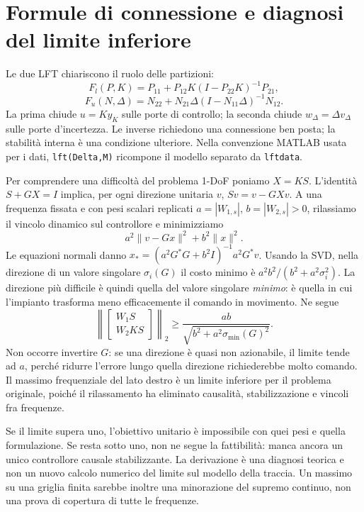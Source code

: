\section{Formule di connessione e diagnosi del limite inferiore}
Le due LFT chiariscono il ruolo delle partizioni:
\begin{equation}\label{eq:lowerlft}
 F_l(P,K)=P_{11}+P_{12}K(I-P_{22}K)^{-1}P_{21},
\end{equation}
\begin{equation}\label{eq:upperlft}
 F_u(N,\Delta)=N_{22}+N_{21}\Delta(I-N_{11}\Delta)^{-1}N_{12}.
\end{equation}
La prima chiude $u=Ky_K$ sulle porte di controllo; la seconda chiude
$w_\Delta=\Delta v_\Delta$ sulle porte d'incertezza. Le inverse
richiedono una connessione ben posta; la stabilità interna è una
condizione ulteriore. Nella convenzione MATLAB usata per i dati,
\texttt{lft(Delta,M)} ricompone il modello separato da \texttt{lftdata}.

Per comprendere una difficoltà del problema 1-DoF poniamo $X=KS$.
L'identità $S+GX=I$ implica, per ogni direzione unitaria $v$,
$Sv=v-GXv$. A una frequenza fissata e con pesi scalari replicati
$a=|W_{1,s}|$, $b=|W_{2,s}|>0$, rilassiamo il vincolo dinamico sul
controllore e minimizziamo
\[
 a^2\|v-Gx\|^2+b^2\|x\|^2.
\]
Le equazioni normali danno
$x_*=(a^2G^*G+b^2I)^{-1}a^2G^*v$.
Usando la SVD, nella direzione di un valore singolare $\sigma_i(G)$
il costo minimo è $a^2b^2/(b^2+a^2\sigma_i^2)$.
La direzione più difficile è quindi quella del valore singolare
\emph{minimo}: è quella in cui l'impianto trasforma meno efficacemente
il comando in movimento. Ne segue
\[
 \left\|\begin{bmatrix}W_1S\\W_2KS\end{bmatrix}\right\|_2
 \ge\frac{ab}{\sqrt{b^2+a^2\sigma_{\min}(G)^2}}.
\]
Non occorre invertire $G$: se una direzione è quasi non azionabile,
il limite tende ad $a$, perché ridurre l'errore lungo quella direzione
richiederebbe molto comando. Il massimo frequenziale del lato destro
è un limite inferiore per il problema originale, poiché il rilassamento
ha eliminato causalità, stabilizzazione e vincoli fra frequenze.

Se il limite supera uno, l'obiettivo unitario è impossibile con quei
pesi e quella formulazione. Se resta sotto uno, non ne segue la
fattibilità: manca ancora un unico controllore causale stabilizzante.
La derivazione è una diagnosi teorica e non un nuovo calcolo numerico
del limite sul modello della traccia. Un massimo su una griglia finita
sarebbe inoltre una minorazione del supremo continuo, non una prova
di copertura di tutte le frequenze.
